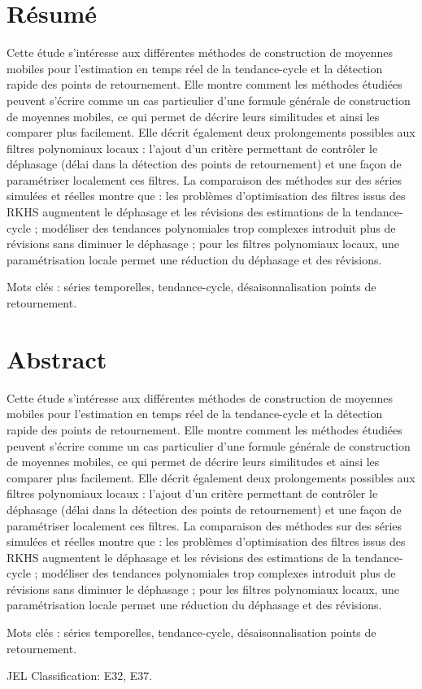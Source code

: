 \thispagestyle{fancy}

\hypertarget{ruxe9sumuxe9}{%
\section*{Résumé}\label{ruxe9sumuxe9}}

Cette étude s'intéresse aux différentes méthodes de construction de
moyennes mobiles pour l'estimation en temps réel de la tendance-cycle et
la détection rapide des points de retournement. Elle montre comment les
méthodes étudiées peuvent s'écrire comme un cas particulier d'une
formule générale de construction de moyennes mobiles, ce qui permet de
décrire leurs similitudes et ainsi les comparer plus facilement. Elle
décrit également deux prolongements possibles aux filtres polynomiaux
locaux : l'ajout d'un critère permettant de contrôler le déphasage
(délai dans la détection des points de retournement) et une façon de
paramétriser localement ces filtres. La comparaison des méthodes sur des
séries simulées et réelles montre que : les problèmes d'optimisation des
filtres issus des RKHS augmentent le déphasage et les révisions des
estimations de la tendance-cycle ; modéliser des tendances polynomiales
trop complexes introduit plus de révisions sans diminuer le déphasage ;
pour les filtres polynomiaux locaux, une paramétrisation locale permet
une réduction du déphasage et des révisions.

Mots clés : séries temporelles, tendance-cycle, désaisonnalisation
points de retournement.

\hypertarget{abstract}{%
\section*{Abstract}\label{abstract}}

Cette étude s'intéresse aux différentes méthodes de construction de
moyennes mobiles pour l'estimation en temps réel de la tendance-cycle et
la détection rapide des points de retournement. Elle montre comment les
méthodes étudiées peuvent s'écrire comme un cas particulier d'une
formule générale de construction de moyennes mobiles, ce qui permet de
décrire leurs similitudes et ainsi les comparer plus facilement. Elle
décrit également deux prolongements possibles aux filtres polynomiaux
locaux : l'ajout d'un critère permettant de contrôler le déphasage
(délai dans la détection des points de retournement) et une façon de
paramétriser localement ces filtres. La comparaison des méthodes sur des
séries simulées et réelles montre que : les problèmes d'optimisation des
filtres issus des RKHS augmentent le déphasage et les révisions des
estimations de la tendance-cycle ; modéliser des tendances polynomiales
trop complexes introduit plus de révisions sans diminuer le déphasage ;
pour les filtres polynomiaux locaux, une paramétrisation locale permet
une réduction du déphasage et des révisions.

Mots clés : séries temporelles, tendance-cycle, désaisonnalisation
points de retournement.

JEL Classification: E32, E37.

\newpage
